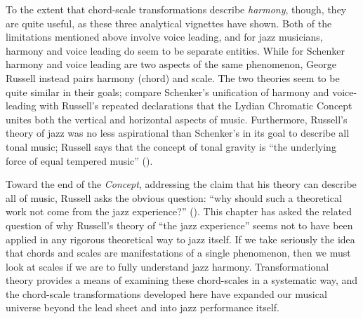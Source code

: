 To the extent that chord-scale transformations describe \emph{harmony},
though, they are quite useful, as these three analytical vignettes have shown.
Both of the limitations mentioned above involve voice leading, and for jazz
musicians, harmony and voice leading do seem to be separate
entities. While for Schenker harmony and voice leading are two
aspects of the same phenomenon, George Russell instead pairs harmony (chord)
and scale. The two theories seem to be quite similar in their goals; compare
Schenker's unification of harmony and voice-leading with Russell's repeated
declarations that the Lydian Chromatic Concept unites both the
vertical and horizontal aspects of music. Furthermore, Russell's theory of
jazz was no less aspirational than Schenker's in its goal to describe all
tonal music; Russell says that the concept of tonal
gravity is ``the underlying force of equal tempered music'' ().

Toward the end of the \emph{Concept}, addressing the claim that his theory can
describe all of music, Russell asks the obvious question: ``why should such a
theoretical work not come from the jazz experience?'' (). This chapter
has asked the related question of why Russell's theory of ``the jazz
experience'' seems not to have been applied in any rigorous theoretical way to
jazz itself. If we take seriously the idea that chords and scales are
manifestations of a single phenomenon, then we must look at scales if we are
to fully understand jazz harmony. Transformational theory provides a means of
examining these chord-scales in a systematic way, and the chord-scale
transformations developed here have expanded our musical universe beyond the
lead sheet and into jazz performance itself.


